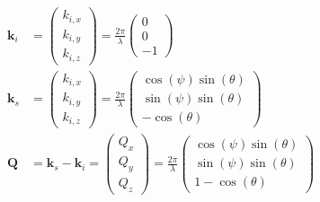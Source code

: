\begin{align}
\mathbf{k}_i &=
    \left(
        \begin{array}{c}
                  k_{i,x} \\
                  k_{i,y} \\
                  k_{i,z}
        \end{array}
    \right)
    = \frac{2\pi}{\lambda}
    \left(
        \begin{array}{c}
                  0\\
                  0 \\
                  -1
        \end{array}
    \right) \\
\mathbf{k}_s &=
    \left(
        \begin{array}{c}
                  k_{i,x} \\
                  k_{i,y} \\
                  k_{i,z}
        \end{array}
    \right)
    = \frac{2\pi}{\lambda}
    \left(
        \begin{array}{c}
                  \cos(\psi) \sin(\theta)\\
                  \sin(\psi) \sin(\theta) \\
                  -\cos(\theta)
        \end{array}
    \right) \\
\mathbf{Q} &= \mathbf{k}_s - \mathbf{k}_i =
    \left(
        \begin{array}{c}
                  Q_{x} \\
                  Q_{y} \\
                  Q_{z}
        \end{array}
    \right)
    = \frac{2\pi}{\lambda}
    \left(
        \begin{array}{c}
                  \cos(\psi) \sin(\theta)\\
                  \sin(\psi) \sin(\theta) \\
                  1-\cos(\theta)
        \end{array}
    \right)
\end{align} 